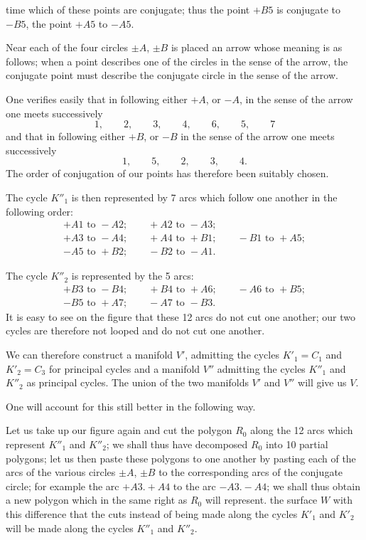 \documentclass{article}
\begin{document}
time which of these points are conjugate; thus the point $+B5$ is conjugate to $-B5$, the point $+A5$ to $-A5$.

Near each of the four circles $\pm A$, $\pm B$ is placed an arrow whose meaning is as follows; when a point describes one of the circles in the sense of the arrow, the conjugate point must describe the conjugate circle in the sense of the arrow.

One verifies easily that in following either $+A$, or $-A$, in the sense of the arrow one meets successively
\[ 1, \qquad 2, \qquad 3, \qquad 4, \qquad 6, \qquad 5, \qquad 7 \]
and that in following either $+B$, or $-B$ in the sense of the arrow one meets successively
\[ 1, \qquad 5, \qquad 2, \qquad 3, \qquad 4. \]
The order of conjugation of our points has therefore been suitably chosen.

The cycle $K''_{1}$ is then represented by 7 arcs which follow one another in the following order:
\[ \begin{gathered} +A1 \text{ to } -A2; \qquad +A2 \text{ to } -A3;\\ +A3 \text{ to } -A4; \qquad +A4 \text{ to } +B1; \qquad -B1 \text{ to } +A5;\\ -A5 \text{ to } +B2; \qquad -B2 \text{ to } -A1. \end{gathered} \]

The cycle $K''_{2}$ is represented by the 5 arcs:
\[ \begin{gathered} +B3 \text{ to } -B4; \qquad +B4 \text{ to } +A6; \qquad -A6 \text{ to } +B5;\\ -B5 \text{ to } +A7; \qquad -A7 \text{ to } -B3. \end{gathered} \]
It is easy to see on the figure that these 12 arcs do not cut one another; our two cycles are therefore not looped and do not cut one another.

We can therefore construct a manifold $V'$, admitting the cycles $K'_{1} = C_{1}$ and $K'_{2} = C_{3}$ for principal cycles and a manifold $V''$ admitting the cycles $K''_{1}$ and $K''_{2}$ as principal cycles. The union of the two manifolds $V'$ and $V''$ will give us $V$.

One will account for this still better in the following way.

Let us take up our figure again and cut the polygon $R_{0}$ along the 12 arcs which represent $K''_{1}$ and $K''_{2}$; we shall thus have decomposed $R_{0}$ into 10 partial polygons; let us then paste these polygons to one another by pasting each of the arcs of the various circles $\pm A$, $\pm B$ to the corresponding arcs of the conjugate circle; for example the arc $+A3. +A4$ to the arc $-A3. -A4$; we shall thus obtain a new polygon which in the same right as $R_{0}$ will represent. the surface $W$ with this difference that the cuts instead of being made along the cycles $K'_{1}$ and $K'_{2}$ will be made along the cycles $K''_{1}$ and $K''_{2}$.
\end{document}
